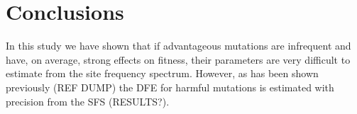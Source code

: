 \documentclass[11pt]{article}
\begin{document}
\section*{Conclusions}

In this study we have shown that if advantageous mutations are infrequent and have, on average, strong effects on fitness, their parameters are very difficult to estimate from the site frequency spectrum. However, as has been shown previously (REF DUMP) the DFE for harmful mutations is estimated with precision from the SFS (RESULTS?).
\end{document}
